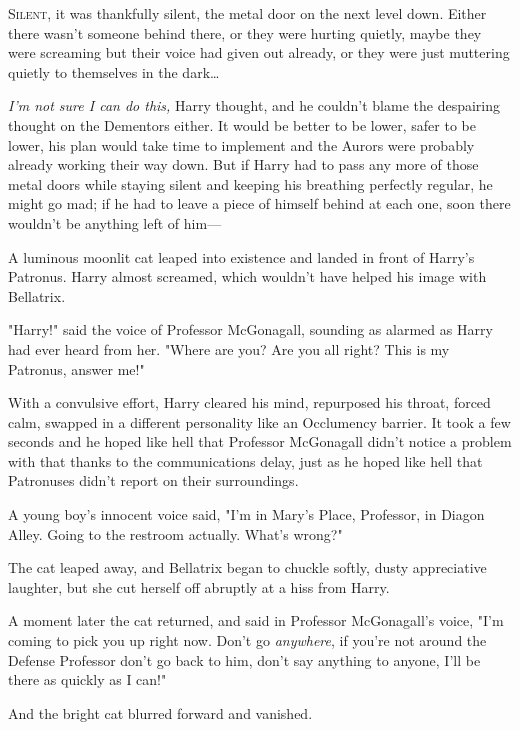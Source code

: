 
\lettrine{S}{ilent}, it was 
thankfully silent, the metal door on the next level down. Either there wasn't 
someone behind there, or they were hurting quietly, maybe they were screaming 
but their voice had given out already, or they were just muttering quietly to 
themselves in the dark{\ldots}

\emph{I'm not sure I can do this,} Harry thought, and he couldn't blame the 
despairing thought on the Dementors either. It would be better to be lower, 
safer to be lower, his plan would take time to implement and the Aurors were 
probably already working their way down. But if Harry had to pass any more of 
those metal doors while staying silent and keeping his breathing perfectly 
regular, he might go mad; if he had to leave a piece of himself behind at each 
one, soon there wouldn't be anything left of him---

A luminous moonlit cat leaped into existence and landed in front of Harry's 
Patronus. Harry almost screamed, which wouldn't have helped his image with 
Bellatrix.

"Harry!" said the voice of Professor McGonagall, sounding as alarmed as Harry 
had ever heard from her. "Where are you? Are you all right? This is my 
Patronus, answer me!"

With a convulsive effort, Harry cleared his mind, repurposed his throat, forced 
calm, swapped in a different personality like an Occlumency barrier. It took a 
few seconds and he hoped like hell that Professor McGonagall didn't notice a 
problem with that thanks to the communications delay, just as he hoped like 
hell that Patronuses didn't report on their surroundings.

A young boy's innocent voice said, "I'm in Mary's Place, Professor, in Diagon 
Alley. Going to the restroom actually. What's wrong?"

The cat leaped away, and Bellatrix began to chuckle softly, dusty appreciative 
laughter, but she cut herself off abruptly at a hiss from Harry.

A moment later the cat returned, and said in Professor McGonagall's voice, "I'm 
coming to pick you up right now. Don't go \emph{anywhere}, if you're not around 
the Defense Professor don't go back to him, don't say anything to anyone, I'll 
be there as quickly as I can!"

And the bright cat blurred forward and vanished.

